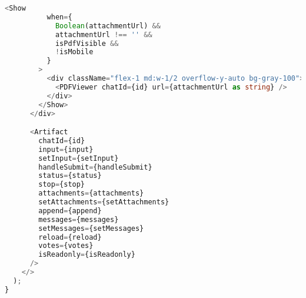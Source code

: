 \begin{lstlisting}[language=TypeScript, caption={Chat dengan AI}]
        <Show
          when={
            Boolean(attachmentUrl) &&
            attachmentUrl !== '' &&
            isPdfVisible &&
            !isMobile
          }
        >
          <div className="flex-1 md:w-1/2 overflow-y-auto bg-gray-100">
            <PDFViewer chatId={id} url={attachmentUrl as string} />
          </div>
        </Show>
      </div>

      <Artifact
        chatId={id}
        input={input}
        setInput={setInput}
        handleSubmit={handleSubmit}
        status={status}
        stop={stop}
        attachments={attachments}
        setAttachments={setAttachments}
        append={append}
        messages={messages}
        setMessages={setMessages}
        reload={reload}
        votes={votes}
        isReadonly={isReadonly}
      />
    </>
  );
}
\end{lstlisting}